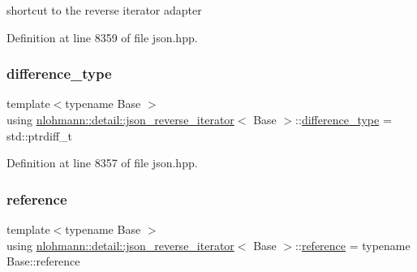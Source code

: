 shortcut to the reverse iterator adapter 



Definition at line 8359 of file json.\+hpp.

\mbox{\label{classnlohmann_1_1detail_1_1json__reverse__iterator_a9ab55987c05ec6427ad36082e351cc45}} 
\subsubsection{\texorpdfstring{difference\_type}{difference\_type}}
{\footnotesize\ttfamily template$<$typename Base $>$ \\
using \mbox{\hyperlink{classnlohmann_1_1detail_1_1json__reverse__iterator}{nlohmann\+::detail\+::json\+\_\+reverse\+\_\+iterator}}$<$ Base $>$\+::\mbox{\hyperlink{classnlohmann_1_1detail_1_1json__reverse__iterator_a9ab55987c05ec6427ad36082e351cc45}{difference\+\_\+type}} =  std\+::ptrdiff\+\_\+t}



Definition at line 8357 of file json.\+hpp.

\mbox{\label{classnlohmann_1_1detail_1_1json__reverse__iterator_a42f51a69bac7b2aebb613b2164e457f1}} 
\subsubsection{\texorpdfstring{reference}{reference}}
{\footnotesize\ttfamily template$<$typename Base $>$ \\
using \mbox{\hyperlink{classnlohmann_1_1detail_1_1json__reverse__iterator}{nlohmann\+::detail\+::json\+\_\+reverse\+\_\+iterator}}$<$ Base $>$\+::\mbox{\hyperlink{classnlohmann_1_1detail_1_1json__reverse__iterator_a42f51a69bac7b2aebb613b2164e457f1}{reference}} =  typename Base\+::reference}



